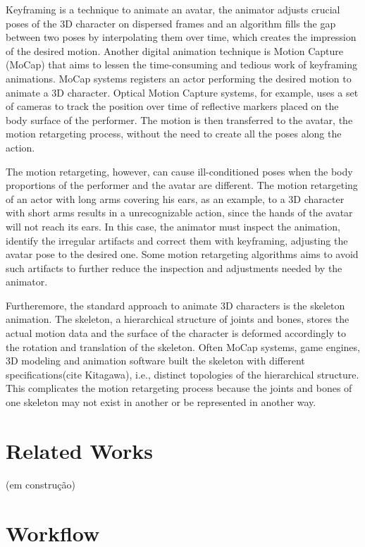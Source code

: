 \documentclass{vgtc}
\begin{document}
Keyframing is a technique to animate an avatar, the animator adjusts
crucial poses of the 3D character on dispersed frames and an algorithm
fills the gap between two poses by interpolating them over time, which
creates the impression of the desired motion. Another digital animation
technique is Motion Capture (MoCap) that aims to lessen the
time-consuming and tedious work of keyframing animations. MoCap systems
registers an actor performing the desired motion to animate a 3D
character. Optical Motion Capture systems, for example, uses a set of
cameras to track the position over time of reflective markers placed on
the body surface of the performer. The motion is then transferred to the
avatar, the motion retargeting process, without the need to create all
the poses along the action.

The motion retargeting, however, can cause ill-conditioned poses when
the body proportions of the performer and the avatar are different. The
motion retargeting of an actor with long arms covering his ears, as an
example, to a 3D character with short arms results in a unrecognizable
action, since the hands of the avatar will not reach its ears. In this
case, the animator must inspect the animation, identify the irregular
artifacts and correct them with keyframing, adjusting the avatar pose to
the desired one. Some motion retargeting algorithms aims to avoid such
artifacts to further reduce the inspection and adjustments needed by the
animator.

Furtheremore, the standard approach to animate 3D characters is the
skeleton animation. The skeleton, a hierarchical structure of joints and
bones, stores the actual motion data and the surface of the character is
deformed accordingly to the rotation and translation of the skeleton.
Often MoCap systems, game engines, 3D modeling and animation software
built the skeleton with different specifications(cite Kitagawa), i.e.,
distinct topologies of the hierarchical structure. This complicates the
motion retargeting process because the joints and bones of one skeleton
may not exist in another or be represented in another way.

    \hypertarget{related-works}{%
\section{Related Works}\label{related-works}}

(em construção)

    \hypertarget{workflow}{%
\section{Workflow}\label{workflow}}
\end{document}
